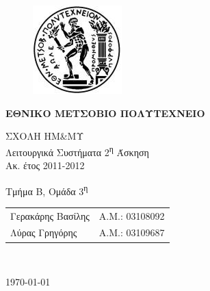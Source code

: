 \begin{titlepage}
\begin{center}
\begin{figure}[t] 
     \includegraphics[scale=0.7]{title/ntua_logo}
\end{figure}
\begin{LARGE}\textbf{ΕΘΝΙΚΟ ΜΕΤΣΟΒΙΟ ΠΟΛΥΤΕΧΝΕΙΟ\\}\end{LARGE}
\vspace{2cm}
\begin{Large}
ΣΧΟΛΗ ΗΜ\&ΜΥ\\
Λειτουργικά Συστήματα
2\textsuperscript{η} Άσκηση\\
Ακ. έτος 2011-2012\\
\end{Large}
\vspace{5cm}
\Large Τμήμα Β, Ομάδα 3\textsuperscript{η}\\
\vspace{1cm}
\begin{tabular}{l r}
\Large{Γερακάρης Βασίλης}&
\large{Α.Μ.: 03108092}\\
\Large{Λύρας Γρηγόρης}&
\large{Α.Μ.: 03109687}\\
\end{tabular}\\
\vspace{5cm}

\vfill
\large\today\\
\end{center}
\end{titlepage}

